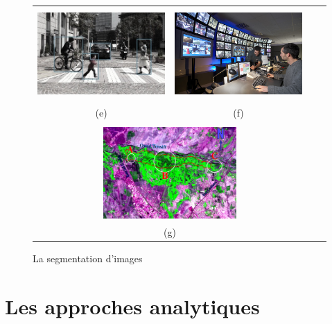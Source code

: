 \begin{figure}[h]
\begin{tabular}{cccc}
\includegraphics[width=5.5cm, height=3.5cm]{Figures/chap1/DetectionPieton.png}
&
\includegraphics[width=5.5cm, height=3.5cm]{Figures/chap1/videoSurveil.jpeg}\\
(e) & (f)\\\\

\multicolumn{2}{c}{\includegraphics[width=5.5cm, height=3.5cm]{Figures/chap1/Satellite.png}}\\
\multicolumn{2}{c}{(g)}\\

\end{tabular}
\caption[TraitementImage]{La segmentation d'images}

\end{figure}



\section{Les approches analytiques}

